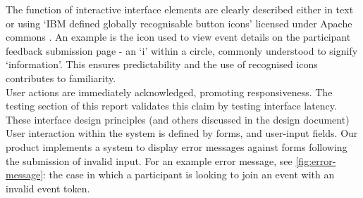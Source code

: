 \documentclass[9pt, titlepage]{extarticle}
\begin{document}
The function of interactive interface elements are clearly described either in text or using ‘IBM defined globally recognisable button icons’ \cite{ibm} licensed under Apache commons \cite{open}. An example is the icon used to view event details on the participant feedback submission page - an `i' within a circle, commonly understood to signify `information'. This ensures predictability and the use of recognised icons contributes to familiarity. \\

User actions are immediately acknowledged, promoting responsiveness. The testing section of this report validates this claim by testing interface latency. These interface design principles (and others discussed in the design document) \\

User interaction within the system is defined by forms, and user-input fields. Our product implements a system to display error messages against forms following the submission of invalid input. For an example error message, see \autoref{fig:error-message}: the case in which a participant is looking to join an event with an invalid event token. 
\end{document}
